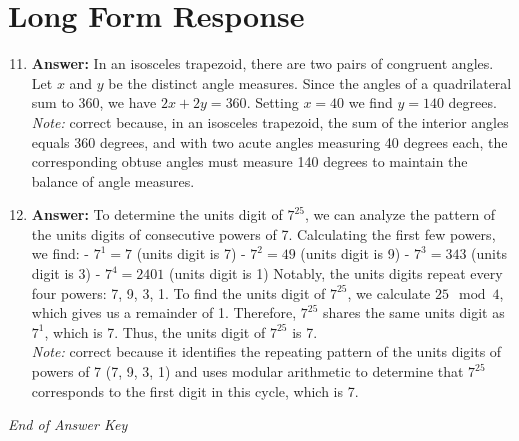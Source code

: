 \documentclass[12pt]{article}
\begin{document}
\section*{Long Form Response}
\begin{enumerate}[label=\arabic*.]
\setcounter{enumi}{10}
\item \textbf{Answer:} In an isosceles trapezoid, there are two pairs of congruent angles. Let $x$ and $y$ be the distinct angle measures. Since the angles of a quadrilateral sum to 360, we have $2 x+2 y=360$. Setting $x=40$ we find $y=\boxed{140}$ degrees.
\\ \textit{Note:} correct because, in an isosceles trapezoid, the sum of the interior angles equals 360 degrees, and with two acute angles measuring 40 degrees each, the corresponding obtuse angles must measure 140 degrees to maintain the balance of angle measures.
\item \textbf{Answer:} To determine the units digit of \( 7^{25} \), we can analyze the pattern of the units digits of consecutive powers of 7. Calculating the first few powers, we find: - \( 7^1 = 7 \) (units digit is 7) - \( 7^2 = 49 \) (units digit is 9) - \( 7^3 = 343 \) (units digit is 3) - \( 7^4 = 2401 \) (units digit is 1) Notably, the units digits repeat every four powers: 7, 9, 3, 1. To find the units digit of \( 7^{25} \), we calculate \( 25 \mod 4 \), which gives us a remainder of 1. Therefore, \( 7^{25} \) shares the same units digit as \( 7^1 \), which is 7. Thus, the units digit of \( 7^{25} \) is 7.
\\ \textit{Note:} correct because it identifies the repeating pattern of the units digits of powers of 7 (7, 9, 3, 1) and uses modular arithmetic to determine that \( 7^{25} \) corresponds to the first digit in this cycle, which is 7.
\end{enumerate}

\vfill
\noindent\textit{End of Answer Key}
\end{document}
